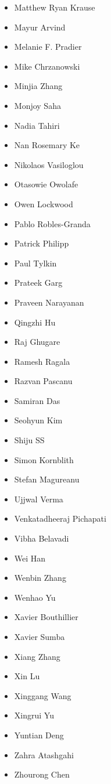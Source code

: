 \begin{multicols}{3}
\begin{itemize}[label={}]
  \item Matthew Ryan Krause
  \item Mayur Arvind
  \item Melanie F. Pradier
  \item Mike Chrzanowski
  \item Minjia Zhang
  \item Monjoy Saha
  \item Nadia Tahiri
  \item Nan Rosemary Ke
  \item Nikolaos Vasiloglou
  \item Otasowie Owolafe
  \item Owen Lockwood
  \item Pablo Robles-Granda
  \item Patrick Philipp
  \item Paul Tylkin
  \item Prateek Garg
  \item Praveen Narayanan
  \item Qingzhi Hu
  \item Raj Ghugare
  \item Ramesh Ragala
  \item Razvan Pascanu
  \item Samiran Das
  \item Seohyun Kim
  \item Shiju SS
  \item Simon Kornblith
  \item Stefan Magureanu
  \item Ujjwal Verma
  \item Venkatadheeraj Pichapati
  \item Vibha Belavadi
  \item Wei Han
  \item Wenbin Zhang
  \item Wenhao Yu
  \item Xavier Bouthillier
  \item Xavier Sumba
  \item Xiang Zhang
  \item Xin Lu
  \item Xinggang Wang
  \item Xingrui Yu
  \item Yuntian Deng
  \item Zahra Atashgahi
  \item Zhourong Chen
\end{itemize}
\end{multicols}
\endgroup
